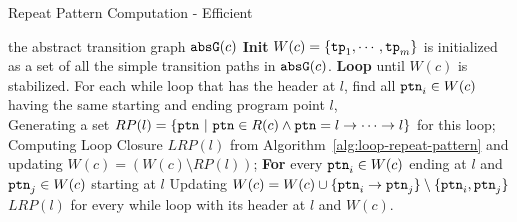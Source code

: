 \begin{algorithm}
\caption{
{Repeat Pattern Computation - Efficient}
\label{alg:repeat-pattern}
}
\begin{algorithmic}[1]
\REQUIRE the abstract transition graph $\mathtt{abs}{\mathtt{G}}(c)$
\STATE  \textbf{Init} $W(c) = \{\mathtt{tp}_1, \cdots, \mathtt{tp}_m\}$ is initialized as a set of all the simple transition paths in $\mathtt{abs}{\mathtt{G}}(c)$.
\STATE  \textbf{Loop} until $W(c)$ is stabilized.
\STATE    \quad For each while loop that has the header at $l$, find all $\mathtt{ptn}_i \in W(c)$ having the same starting and ending program point $l$,
      \\  \quad \quad Generating a set $RP(l) = \{\mathtt{ptn} ~|~ \mathtt{ptn} \in R(c) \land \mathtt{ptn} = l \to \cdots \to l\}$ for this loop;
\STATE    \quad \quad Computing Loop Closure $LRP(l)$ from Algorithm~\ref{alg:loop-repeat-pattern} and updating $W(c) = (W(c) \setminus RP(l))$;
\STATE  \quad \quad  \textbf{For}  every  $\mathtt{ptn}_i \in W(c)$ ending at $l$ and $\mathtt{ptn}_j \in W(c)$ starting at $l$
\STATE  \quad \quad \quad Updating $W(c) = W(c)  \cup \{\mathtt{ptn}_i \to \mathtt{ptn}_j\} \setminus \{\mathtt{ptn}_i, \mathtt{ptn}_j\}$ 
\RETURN $LRP(l)$ for every while loop with its header at $l$ and $W(c)$.
\end{algorithmic}
\end{algorithm}
%
